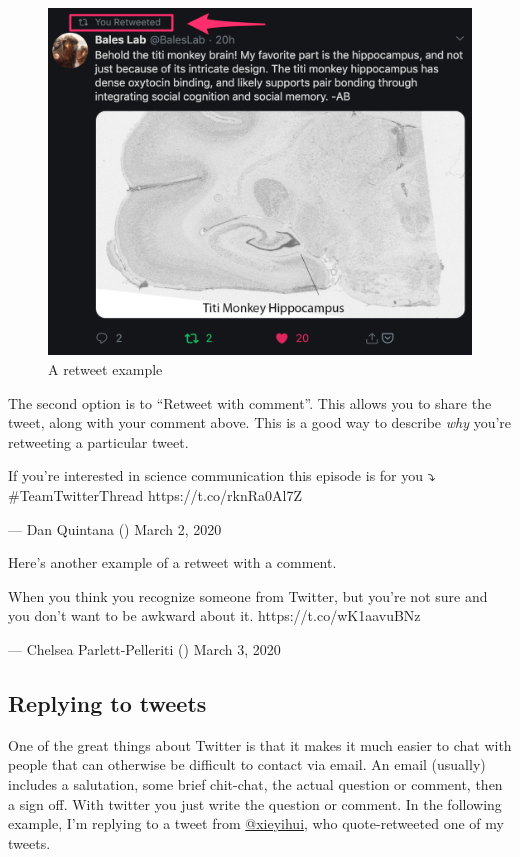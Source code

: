 \documentclass[]{book}
\begin{document}
\begin{figure}

\includegraphics[width=0.8\linewidth]{images/retweet} \hfill{}

\caption{A retweet example}\label{fig:unnamed-chunk-4}
\end{figure}

The second option is to ``Retweet with comment''. This allows you to share the tweet, along with your comment above. This is a good way to describe \emph{why} you're retweeting a particular tweet.

If you're interested in science communication this episode is for you ⤵️ \#TeamTwitterThread https://t.co/rknRa0Al7Z

--- Dan Quintana (\citet{dsquintana}) March 2, 2020

Here's another example of a retweet with a comment.

When you think you recognize someone from Twitter, but you're not sure and you don't want to be awkward about it. https://t.co/wK1aavuBNz

--- Chelsea Parlett-Pelleriti (\citet{ChelseaParlett}) March 3, 2020

\hypertarget{replying-to-tweets}{%
\subsection{Replying to tweets}\label{replying-to-tweets}}

One of the great things about Twitter is that it makes it much easier to chat with people that can otherwise be difficult to contact via email. An email (usually) includes a salutation, some brief chit-chat, the actual question or comment, then a sign off. With twitter you just write the question or comment. In the following example, I'm replying to a tweet from \href{https://twitter.com/xieyihui}{@xieyihui}, who quote-retweeted one of my tweets.
\end{document}
